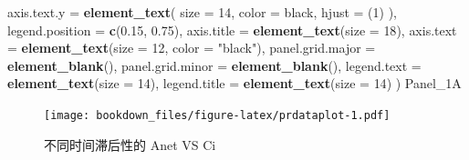 \documentclass[
]{krantz}
\makeatletter
\newenvironment{Shaded}{\begin{snugshade}}{\end{snugshade}}
\newcommand{\DataTypeTok}[1]{\textcolor[rgb]{0.13,0.29,0.53}{#1}}
\newcommand{\DecValTok}[1]{\textcolor[rgb]{0.00,0.00,0.81}{#1}}
\newcommand{\FloatTok}[1]{\textcolor[rgb]{0.00,0.00,0.81}{#1}}
\newcommand{\KeywordTok}[1]{\textcolor[rgb]{0.13,0.29,0.53}{\textbf{#1}}}
\newcommand{\NormalTok}[1]{#1}
\newcommand{\StringTok}[1]{\textcolor[rgb]{0.31,0.60,0.02}{#1}}
\newenvironment{kframe}{%
\medskip{}
\setlength{\fboxsep}{.8em}
 \def\at@end@of@kframe{}%
 \ifinner\ifhmode%
  \def\at@end@of@kframe{\end{minipage}}%
  \begin{minipage}{\columnwidth}%
 \fi\fi%
 \def\FrameCommand##1{\hskip\@totalleftmargin \hskip-\fboxsep
 \colorbox{shadecolor}{##1}\hskip-\fboxsep
     \hskip-\linewidth \hskip-\@totalleftmargin \hskip\columnwidth}%
 \MakeFramed {\advance\hsize-\width
   \@totalleftmargin\z@ \linewidth\hsize
   \@setminipage}}%
 {\par\unskip\endMakeFramed%
 \at@end@of@kframe}
\renewenvironment{Shaded}{\begin{kframe}}{\end{kframe}}
\makeatother
\begin{document}
\begin{Shaded}
\begin{Highlighting}[]
    \DataTypeTok{axis.text.y =}
      \KeywordTok{element\_text}\NormalTok{(}
        \DataTypeTok{size =} \DecValTok{14}\NormalTok{,}
        \DataTypeTok{color =} \StringTok{\textquotesingle{}black\textquotesingle{}}\NormalTok{,}
        \DataTypeTok{hjust =}\NormalTok{ (}\DecValTok{1}\NormalTok{)}
\NormalTok{      ),}
    \DataTypeTok{legend.position =} \KeywordTok{c}\NormalTok{(}\FloatTok{0.15}\NormalTok{, }\FloatTok{0.75}\NormalTok{),}
    \DataTypeTok{axis.title =} \KeywordTok{element\_text}\NormalTok{(}\DataTypeTok{size =} \DecValTok{18}\NormalTok{),}
    \DataTypeTok{axis.text =} \KeywordTok{element\_text}\NormalTok{(}\DataTypeTok{size =} \DecValTok{12}\NormalTok{, }\DataTypeTok{color =} \StringTok{"black"}\NormalTok{),}
    \DataTypeTok{panel.grid.major =} \KeywordTok{element\_blank}\NormalTok{(),}
    \DataTypeTok{panel.grid.minor =} \KeywordTok{element\_blank}\NormalTok{(),}
    \DataTypeTok{legend.text =} \KeywordTok{element\_text}\NormalTok{(}\DataTypeTok{size =} \DecValTok{14}\NormalTok{),}
    \DataTypeTok{legend.title =} \KeywordTok{element\_text}\NormalTok{(}\DataTypeTok{size =} \DecValTok{14}\NormalTok{)}
\NormalTok{  )}
\NormalTok{Panel\_1A}
\end{Highlighting}
\end{Shaded}

\begin{figure}
\centering
\texttt{[image: bookdown\_files/figure-latex/prdataplot-1.pdf]}
\caption{\label{fig:prdataplot}不同时间滞后性的 Anet VS Ci}
\end{figure}
\end{document}
